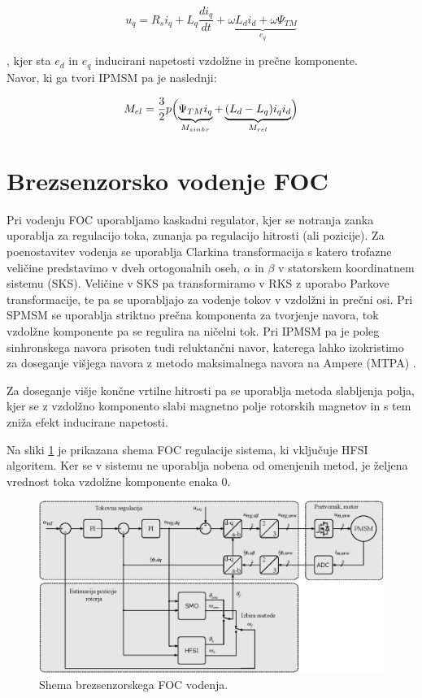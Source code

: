 \documentclass[a4paper,twoside,openright,12pt,slovene]{book}
\begin{document}
\begin{equation} \label{motorModelQ}
    u_q = R_si_q+L_q\frac{di_q}{dt}+\underbrace{\omega L_di_d + \omega\Psi_{TM}}_{e_q}
\end{equation}

, kjer sta $e_d$ in $e_q$ inducirani napetosti vzdolžne in prečne komponente.
\\
Navor, ki ga tvori IPMSM pa je naslednji:

\begin{equation}
    M_{el} = \frac{3}{2}p\Bigl(\underbrace{\Psi_{TM}i_q}_{M_{sinhr}}+\underbrace{(L_d-L_q)i_qi_d}_{M_{rel}}\Bigr)
\end{equation}



\section{Brezsenzorsko vodenje FOC}

Pri vodenju FOC uporabljamo kaskadni regulator, kjer se notranja zanka uporablja za regulacijo toka, zunanja pa regulacijo hitrosti (ali pozicije). Za poenostavitev vodenja se uporablja Clarkina
transformacija s katero trofazne veličine predstavimo v dveh ortogonalnih oseh, $\alpha$ in $\beta$ v statorskem koordinatnem sistemu (SKS). Veličine v SKS pa transformiramo v RKS z uporabo Parkove
transformacije, te pa se uporabljajo za vodenje tokov v vzdolžni in prečni osi. Pri SPMSM se uporablja striktno prečna komponenta za tvorjenje navora, tok vzdolžne komponente pa se regulira na ničelni
tok. Pri IPMSM pa je poleg sinhronskega navora prisoten tudi reluktančni navor, katerega lahko izokristimo za doseganje višjega navora z metodo maksimalnega navora na Ampere (MTPA)
\cite{ambrovzivc2016elektrivcni}.

Za doseganje višje končne vrtilne hitrosti pa se uporablja metoda slabljenja polja, kjer se z vzdolžno komponento slabi magnetno polje rotorskih magnetov in s tem zniža efekt inducirane
napetosti\cite{ambrovzivc2016elektrivcni}.

Na sliki \ref{FOCshema} je prikazana shema FOC regulacije sistema, ki vključuje HFSI algoritem. Ker se v sistemu ne uporablja nobena od omenjenih metod, je željena vrednost toka vzdolžne komponente
enaka 0.

\begin{figure}[!htbp]
    \centering
    \includegraphics[width=1\columnwidth]{Slike/Inkscape/FOC.eps}
    \caption{\label{FOCshema} Shema brezsenzorskega FOC vodenja.}
\end{figure}
\end{document}

